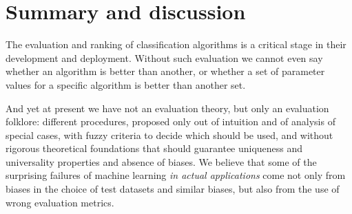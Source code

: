 \documentclass[\ifafour a4paper,12pt,\else a5paper,10pt,\fi%
onecolumn,oneside,article,%
british%
]{memoir}
\theoremstyle{remark}
\theoremstyle{innote}
\renewcommand*{\|}[1][]{\nonscript\:#1\vert\nonscript\:\mathopen{}}
\newcommand*{\eg}{{e.g.}}
\begin{document}
%




\section{Summary and discussion}
\label{sec:discussion}

The evaluation and ranking of classification algorithms is a critical stage in their development and deployment. Without such evaluation we cannot even say whether an algorithm is better than another, or whether a set of parameter values for a specific algorithm is better than another set.

And yet at present we have not an evaluation theory, but only an evaluation folklore: different procedures, proposed only out of intuition and of analysis of special cases, with fuzzy criteria to decide which should be used, and without rigorous theoretical foundations that should guarantee uniqueness and universality properties and absence of biases. We believe that some of the surprising failures of machine learning \emph{in actual applications}\autocites[see \eg][]{varoquauxetal2022} come not only from biases in the choice of test datasets and similar biases, but also from the use of wrong evaluation metrics.
\end{document}
